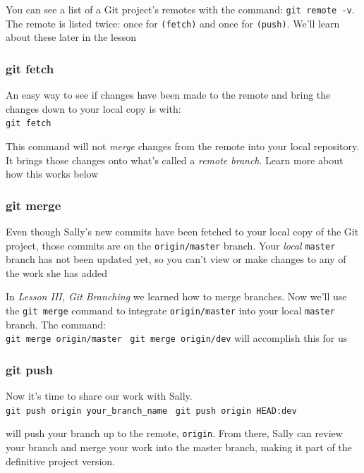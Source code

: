 \documentclass[a4paper, 12pt]{article}
\begin{document}
You can see a list of a Git project's remotes with the command: \verb|git remote -v|. The remote is listed twice: once for \verb|(fetch)| and once for \verb|(push)|. We'll learn about these later in the lesson

\subsubsection{git fetch}
An easy way to see if changes have been made to the remote and bring the changes down to your local copy is with:\\ \verb|git fetch|

This command will not \textit{merge} changes from the remote into your local repository. It brings those changes onto what's called a \textit{remote branch}. Learn more about how this works below

\subsubsection{git merge}
Even though Sally's new commits have been fetched to your local copy of the Git project, those commits are on the \verb|origin/master| branch. Your \textit{local} \verb|master| branch has not been updated yet, so you can't view or make changes to any of the work she has added

In \textit{Lesson III, Git Branching} we learned how to merge branches. Now we'll use the \verb|git merge| command to integrate \verb|origin/master| into your local \verb|master| branch. The command:\\
\verb|git merge origin/master| \textbar~\verb|git merge origin/dev| will accomplish this for us

\subsubsection{git push}
Now it's time to share our work with Sally.\\
\verb|git push origin your_branch_name| \textbar~\verb|git push origin HEAD:dev|

will push your branch up to the remote, \verb|origin|. From there, Sally can review your branch and merge your work into the master branch, making it part of the definitive project version.
\end{document}
